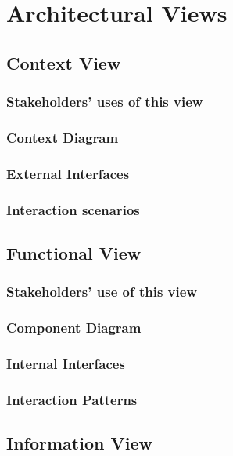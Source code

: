 \chapter{Architectural Views}

\section{Context View}

\subsection{Stakeholders' uses of this view}

\subsection{Context Diagram}

\subsection{External Interfaces}

\subsection{Interaction scenarios}

\section{Functional View}

\subsection{Stakeholders' use of this view}

\subsection{Component Diagram}

\subsection{Internal Interfaces}

\subsection{Interaction Patterns}

\section{Information View}

